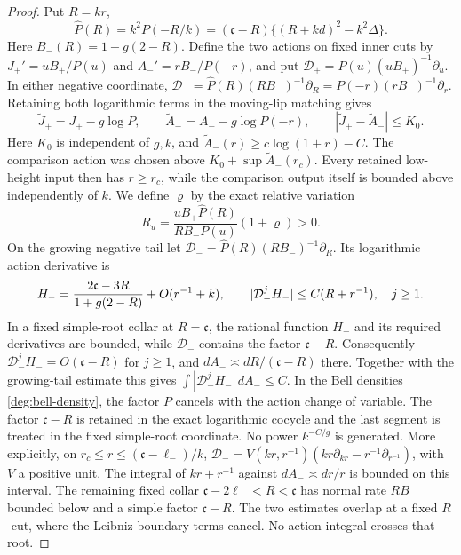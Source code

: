\begin{proof}
Put \(R=kr\),
\[
 \widehat P(R)=k^2P(-R/k)
  =(\mathfrak c-R)\{(R+kd)^2-k^2\Delta\}.
\]
Here \(B_-(R)=1+g(2-R)\).  Define the two actions on fixed inner
cuts by \(J_+'=uB_+/P(u)\) and
\(A_-'=rB_- /P(-r)\), and put
\(\mathcal D_+=P(u)(uB_+)^{-1}\partial_u\).
In either negative coordinate,
\(\mathcal D_-= \widehat P(R)(RB_-)^{-1}\partial_R
=P(-r)(rB_-)^{-1}\partial_r\).
Retaining both logarithmic terms in the moving-lip matching gives
\[
 \widetilde J_+=J_+-g\log P,\qquad
 \widetilde A_-=A_--g\log P(-r),\qquad
 |\widetilde J_+-\widetilde A_-|\le K_0 .
\]
Here \(K_0\) is independent of \(g,k\), and
\(\widetilde A_-(r)\ge c\log(1+r)-C\).
The comparison action was chosen above
\(K_0+\sup\widetilde A_-(r_c)\).
Every retained low-height input then has \(r\ge r_c\), while the
comparison output itself is bounded above independently of \(k\).
We define \(\varrho\) by the exact relative variation
\[
 R_u=\frac{uB_+\widehat P(R)}{RB_-P(u)}(1+\varrho)>0 .
\]
On the growing negative tail let
\(\mathcal D_-=\widehat P(R)(RB_-)^{-1}\partial_R\).  Its logarithmic
action derivative is
\begin{equation}
 H_-={2\mathfrak c-3R\over1+g(2-R)}+O(r^{-1}+k),\qquad
 |\mathcal D_-^jH_-|\le C(R+r^{-1}),\quad j\ge1.
 \label{deg:quadratic-negative-action}
\end{equation}
In a fixed simple-root collar at \(R=\mathfrak c\), the rational
function \(H_-\) and its required derivatives are bounded, while
\(\mathcal D_-\) contains the factor \(\mathfrak c-R\).
Consequently \(\mathcal D_-^jH_-=O(\mathfrak c-R)\) for \(j\ge1\),
and \(dA_-\asymp dR/(\mathfrak c-R)\) there.  Together with the
growing-tail estimate this gives
\(\int|\mathcal D_-^jH_-|\,dA_-\le C\).  In the Bell densities
\eqref{deg:bell-density}, the factor \(P\) cancels with the action
change of variable.  The factor \(\mathfrak c-R\) is retained in the
exact logarithmic cocycle and the last segment is treated in the fixed
simple-root coordinate.  No power \(k^{-C/g}\) is generated.
More explicitly, on \(r_c\le r\le(\mathfrak c-\ell_-)/k\),
\(\mathcal D_-=V(kr,r^{-1})(kr\partial_{kr}
-r^{-1}\partial_{r^{-1}})\), with \(V\) a positive unit.
The integral of \(kr+r^{-1}\) against \(dA_-\asymp dr/r\)
is bounded on this interval.  The remaining fixed collar
\(\mathfrak c-2\ell_-<R<\mathfrak c\) has normal rate
\(RB_-\) bounded below and a simple factor \(\mathfrak c-R\).
The two estimates overlap at a fixed \(R\)-cut, where the
Leibniz boundary terms cancel.  No action integral crosses that root.


\end{proof}
